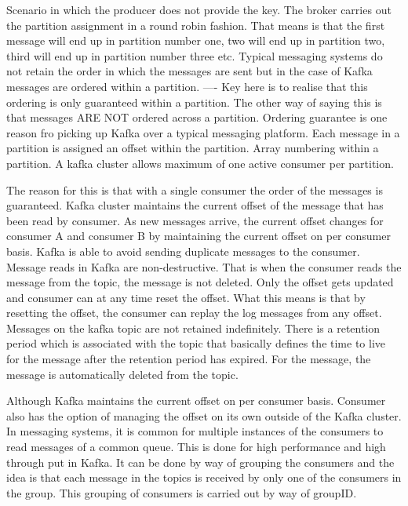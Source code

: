 \documentclass[a4paper, 11pt]{book}
\begin{document}
    Scenario in which the producer does not provide the key.
    The broker carries out the partition assignment in a round robin fashion.
    That means is that the first message will end up in partition number one, two will end up in partition two, third will end up in partition number three etc.
    Typical messaging systems do not retain the order in which the messages are sent but in the case of Kafka messages are ordered within a partition.
    ---- Key here is to realise that this ordering is only guaranteed within a partition.
    The other way of saying this is that messages ARE NOT ordered across a partition.
    Ordering guarantee is one reason fro picking up Kafka over a typical messaging platform.
    Each message in a partition is assigned an offset within the partition. Array numbering within a partition.
    A kafka cluster allows maximum of one active consumer per partition.

    The reason for this is that with a single consumer the order of the messages is guaranteed.
    Kafka cluster maintains the current offset of the message that has been read by consumer.
    As new messages arrive, the current offset changes for consumer A and consumer B by maintaining the current offset on per consumer basis.
    Kafka is able to avoid sending duplicate messages to the consumer.
    Message reads in Kafka are non-destructive.
    That is when the consumer reads the message from the topic, the message is not deleted. Only the offset gets updated and consumer can at any time reset the offset.
    What this means is that by resetting the offset, the consumer can replay the log messages from any offset.
    Messages on the kafka topic are not retained indefinitely.
    There is a retention period which is associated with the topic that basically defines the time to live for the message after the retention period has expired.
    For the message, the message is automatically deleted from the topic.

    Although Kafka maintains the current offset on per consumer basis.
    Consumer also has the option of managing the offset on its own outside of the Kafka cluster.
    In messaging systems, it is common for multiple instances of the consumers to read messages of a common queue.
    This is done for high performance and high through put in Kafka.
    It can be done by way of grouping the consumers and the idea is that each message in the topics is received by only one of the consumers in the group.
    This grouping of consumers is carried out by way of groupID.
\end{document}

